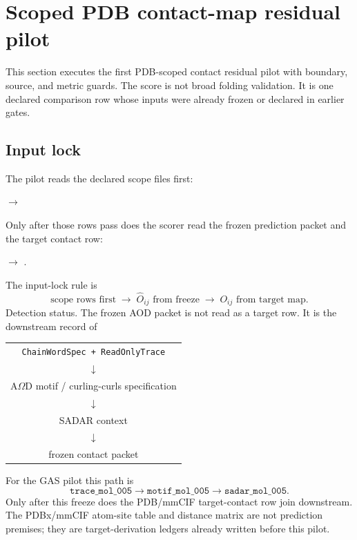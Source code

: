 \section{Scoped PDB contact-map residual pilot}

This section executes the first PDB-scoped contact residual pilot with boundary, source, and metric guards. The score is not broad folding validation. It is one declared comparison row whose inputs were already frozen or declared in earlier gates.

\subsection{Input lock}

The pilot reads the declared scope files first:
\begin{center}
\small
{}
$\rightarrow$
\end{center}
Only after those rows pass does the scorer read the frozen prediction packet and the target contact row:
\begin{center}
\small
{}
$\rightarrow$
.
\end{center}
The input-lock rule is
\[
\text{scope rows first} \;\longrightarrow\; \widehat O_{ij}\text{ from freeze}\;\longrightarrow\; O_{ij}\text{ from target map}.
\]
Detection status. The frozen AOD packet is not read as a target row. It is the downstream record of
\begin{center}
\small
\begin{tabular}{c}
\texttt{ChainWordSpec + ReadOnlyTrace}\\
$\downarrow$\\
A$\Omega$D motif / curling-curls specification\\
$\downarrow$\\
SADAR context\\
$\downarrow$\\
frozen contact packet
\end{tabular}
\end{center}
For the GAS pilot this path is
\[
\texttt{trace\_mol\_005}\to\texttt{motif\_mol\_005}\to\texttt{sadar\_mol\_005}.
\]
Only after this freeze does the PDB/mmCIF target-contact row join downstream.
The PDBx/mmCIF atom-site table and distance matrix are not prediction premises; they are target-derivation ledgers already written before this pilot.

